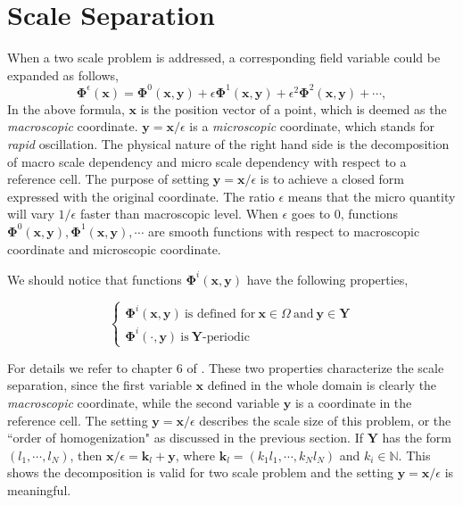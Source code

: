 \documentclass[10pt,a4paper]{scrreprt}
\begin{document}
\section{Scale Separation}
When a two scale problem is addressed, a corresponding field variable could be expanded as follows, 
%
\begin{equation}
\label{eq:field epsi}
\mathbf{\Phi}^{\epsilon}(\mathbf{x}) = \mathbf{\Phi}^{0}(\mathbf{x},\mathbf{y}) + \epsilon\mathbf{\Phi}^{1}(\mathbf{x},\mathbf{y}) + \epsilon^{2} \mathbf{\Phi}^{2}(\mathbf{x},\mathbf{y}) + \cdots,
\end{equation}
%
In the above formula, $\mathbf{x}$ is the position vector of a point, which is deemed as the \textit{macroscopic} coordinate. $\mathbf{y}=\mathbf{x}/\epsilon$ is a \textit{microscopic} coordinate, which stands for \textit{rapid} oscillation. The physical nature of the right hand side is the decomposition of macro scale dependency and micro scale dependency with respect to a reference cell. The purpose of setting $\mathbf{y}=\mathbf{x}/\epsilon$ is to achieve a closed form expressed with the original coordinate. The ratio $\epsilon$ means that the micro quantity will vary $1/\epsilon$ faster than macroscopic level. When $\epsilon$ goes to $0$, functions $\mathbf{\Phi}^{0}(\mathbf{x}, \mathbf{y}), \mathbf{\Phi}^{1}(\mathbf{x}, \mathbf{y}), \cdots$ are smooth functions with respect to macroscopic coordinate and microscopic coordinate.

We should notice that functions $\mathbf{\Phi}^{i}(\mathbf{x},\mathbf{y})$ have the following properties,

\begin{equation}
\label{eq:scale separ prop}
\left\{
\begin{array}{l}
\mathbf{\Phi}^{i}(\mathbf{x},\mathbf{y}) \ \text{is defined for} \ \mathbf{x} \in \Omega \ \text{and} \ \mathbf{y} \in \mathbf{Y} \\
\mathbf{\Phi}^{i}(\cdot, \mathbf{y}) \ \text{is} \ \mathbf{Y} \text{-periodic} 
\end{array}
\right.
\end{equation}

For details we refer to chapter 6 of \citep{cioranescu_introduction_2000}. These two properties characterize the scale separation, since the first variable $\mathbf{x}$ defined in the whole domain is clearly the \textit{macroscopic} coordinate, while the second variable $\mathbf{y}$ is a coordinate in the reference cell. The setting $\mathbf{y}=\mathbf{x}/\epsilon$ describes the scale size of this problem, or the ``order of homogenization" as discussed in the previous section. If $\mathbf{Y}$ has the form $(l_{1}, \cdots, l_{N})$, then $\mathbf{x}/\epsilon = \mathbf{k}_{l} + \mathbf{y}$, where $\mathbf{k}_{l} = (k_{1}l_{1}, \cdots, k_{N}l_{N})$ and $k_{i} \in \mathbb{N}$. This shows the decomposition is valid for two scale problem and the setting $\mathbf{y}=\mathbf{x}/\epsilon$ is meaningful.
\end{document}
